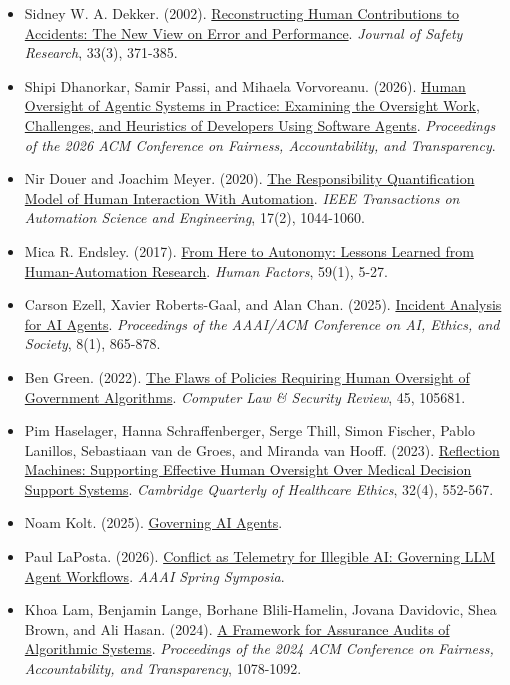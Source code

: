 \documentclass[11pt]{article}
\begin{document}
\begin{itemize}[leftmargin=*]
\item Sidney W. A. Dekker. (2002). \href{https://doi.org/10.1016/S0022-4375(02)00032-4}{Reconstructing Human Contributions to Accidents: The New View on Error and Performance}. \emph{Journal of Safety Research}, 33(3), 371-385.
\item Shipi Dhanorkar, Samir Passi, and Mihaela Vorvoreanu. (2026). \href{https://doi.org/10.1145/3805689.3812402}{Human Oversight of Agentic Systems in Practice: Examining the Oversight Work, Challenges, and Heuristics of Developers Using Software Agents}. \emph{Proceedings of the 2026 ACM Conference on Fairness, Accountability, and Transparency}.
\item Nir Douer and Joachim Meyer. (2020). \href{https://doi.org/10.1109/TASE.2020.2965466}{The Responsibility Quantification Model of Human Interaction With Automation}. \emph{IEEE Transactions on Automation Science and Engineering}, 17(2), 1044-1060.
\item Mica R. Endsley. (2017). \href{https://doi.org/10.1177/0018720816681350}{From Here to Autonomy: Lessons Learned from Human-Automation Research}. \emph{Human Factors}, 59(1), 5-27.
\item Carson Ezell, Xavier Roberts-Gaal, and Alan Chan. (2025). \href{https://doi.org/10.1609/aies.v8i1.36596}{Incident Analysis for AI Agents}. \emph{Proceedings of the AAAI/ACM Conference on AI, Ethics, and Society}, 8(1), 865-878.
\item Ben Green. (2022). \href{https://doi.org/10.1016/j.clsr.2022.105681}{The Flaws of Policies Requiring Human Oversight of Government Algorithms}. \emph{Computer Law \& Security Review}, 45, 105681.
\item Pim Haselager, Hanna Schraffenberger, Serge Thill, Simon Fischer, Pablo Lanillos, Sebastiaan van de Groes, and Miranda van Hooff. (2023). \href{https://doi.org/10.1017/S0963180122000718}{Reflection Machines: Supporting Effective Human Oversight Over Medical Decision Support Systems}. \emph{Cambridge Quarterly of Healthcare Ethics}, 32(4), 552-567.
\item Noam Kolt. (2025). \href{https://arxiv.org/abs/2501.07913}{Governing AI Agents}.
\item Paul LaPosta. (2026). \href{https://doi.org/10.1609/aaaiss.v8i1.42543}{Conflict as Telemetry for Illegible AI: Governing LLM Agent Workflows}. \emph{AAAI Spring Symposia}.
\item Khoa Lam, Benjamin Lange, Borhane Blili-Hamelin, Jovana Davidovic, Shea Brown, and Ali Hasan. (2024). \href{https://doi.org/10.1145/3630106.3658957}{A Framework for Assurance Audits of Algorithmic Systems}. \emph{Proceedings of the 2024 ACM Conference on Fairness, Accountability, and Transparency}, 1078-1092.

\end{itemize}
\end{document}
